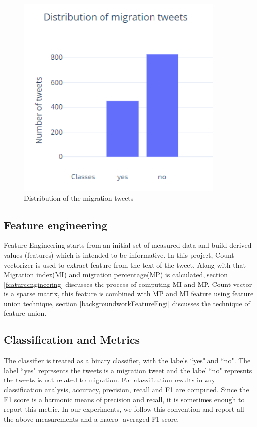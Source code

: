 \begin{figure}
	\centering
	\includegraphics[width=10cm\linewidth,height=10cm]{thesis_template/images/distofmigration_tweetsundefined.png}
	\caption{Distribution of the migration tweets}
	\label{fig:graphDistmigration}
\end{figure}


\subsection{Feature engineering }
Feature Engineering starts from an initial set of measured data and
build derived values (features) which is intended to be informative. In this project, Count vectorizer is used to extract feature from the text of the tweet. Along with that Migration index(MI) and migration percentage(MP) is calculated, section \ref{featureengineering} discusses the process of computing MI and MP. Count vector is a sparse matrix, this feature is combined with MP and MI feature using feature union technique, section \ref{backgroundworkFeatureEngi} discusses the technique of feature union.  

\subsection{Classification and Metrics}
The classifier is treated as a binary classifier, with the labels ``yes" and ``no". The label ``yes" represents the tweets is a migration tweet and the label ``no" represnts the tweets is not related to migration. For classification results in any classification analysis, accuracy, precision, recall and F1 are computed. Since the F1 score is a harmonic means of precision and recall, it is sometimes enough to report this metric. In our experiments, we follow this convention and report all the above measurements and a macro- averaged F1 score.

